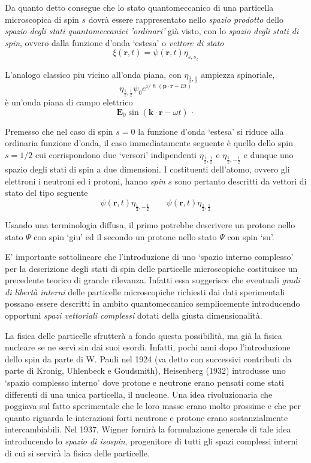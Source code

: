Da quanto detto consegue che lo stato quantomeccanico di una particella microscopica di spin $s$ dovrà essere rappresentato nello \emph{spazio prodotto} dello \emph{spazio degli stati quantomeccanici 'ordinari’} già visto, con lo \emph{spazio degli stati di spin}, ovvero dalla funzione d’onda ‘estesa’ o \emph{vettore di stato}
\[
\xi(\mathbf{r},t) = \psi(\mathbf{r},t) \eta_{s,s_{z}}
\]
\begin{marginfigure}
    L'analogo classico piu vicino all'onda piana, con
    \(\eta_{\frac{1}{2}, \frac{1}{2}}\) ampiezza spinoriale,
    \[
        \eta_{\frac{1}{2}, \frac{1}{2}} \psi_{0}e^{ i/\hslash (\bm{p}\cdot \bm{r} - Et)}
    \] è un'onda piana di campo elettrico
    \[
        \bm{E}_{0} \sin(\bm{k}\cdot \bm{r} - \omega t) \, \cdot
    \]
\end{marginfigure}
Premesso che nel caso di spin $s=0$ la funzione d’onda ‘estesa’ si riduce alla ordinaria funzione d’onda, il caso immediatamente seguente è quello dello spin $s=1 / 2$ cui corrispondono due ‘versori’ indipendenti $\eta_{\frac{1}{2}, \frac{1}{2}}$ e $\eta_{\frac{1}{2}, - \frac{1}{2}}$ e dunque uno spazio degli stati di spin a due dimensioni. I costituenti dell’atomo, ovvero gli elettroni i neutroni ed i protoni, hanno \emph{spin} $s$ sono pertanto descritti da vettori di stato del tipo seguente
\[
\psi(\mathbf{r},t) \eta_{\frac{1}{2}, - \frac{1}{2}} \qquad \psi(\mathbf{r},t) \eta_{\frac{1}{2}, \frac{1}{2}}
\]

Usando una terminologia diffusa, il primo potrebbe descrivere un protone nello stato $\Psi$ con spin ‘giu’ ed il secondo un protone nello stato $\Psi$ con spin ‘su’.
\bigskip

E’ importante sottolineare che l’introduzione di uno ‘spazio interno complesso’ per la descrizione degli stati di spin delle particelle microscopiche costituisce un precedente teorico di grande rilevanza.
Infatti essa suggerisce che eventuali \emph{gradi di libertà interni} delle particelle microscopiche richiesti dai dati sperimentali possano essere descritti in ambito quantomeccanico semplicemente introducendo opportuni \emph{spazi vettoriali complessi} dotati della giusta dimensionalità.

La fisica delle particelle sfrutterà a fondo questa possibilità, ma già la fisica nucleare se ne servì sin dai suoi esordi.
Infatti, pochi anni dopo l’introduzione dello spin da parte di W. Pauli nel 1924 (va detto con successivi contributi da parte di Kronig, Uhlenbeck e Goudsmith), Heisenberg (1932) introdusse uno ‘spazio complesso interno’ dove protone e neutrone erano pensati come stati differenti di una unica particella, il nucleone.
Una idea rivoluzionaria che poggiava sul fatto sperimentale che le loro masse erano molto prossime e che per quanto riguarda le interazioni forti neutrone e protone erano sostanzialmente intercambiabili.
Nel 1937, Wigner fornirà la formulazione generale di tale idea introducendo lo \emph{spazio di isospin}, progenitore di tutti gli spazi complessi interni di cui si servirà la fisica delle particelle.
\bigskip

